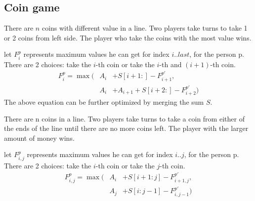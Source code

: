 \subsection{Coin game}
 There are $n$ coins with different value in a line. Two players take turns to take 1 or 2 coins from left side. The player who take the coins with the most value wins.

let $F_i^p$ represents maximum values he can get for index $i..last$, for the person p. There are 2 choices: take the $i$-th coin or take the $i$-th and $(i+1)$-th coin.
\begin{eqnarray*}
F_i^p = \max\big(&A_i&+S[i+1:]-F_{i+1}^{p'},  \\
&A_i&+A_{i+1}+S[i+2:]-F_{i+2}^{p'}\big)
\end{eqnarray*}
The above equation can be further optimized by merging the sum $S$.

There are n coins in a line. Two players take turns to take a coin from either of the ends of the line until there are no more coins left. The player with the larger amount of money wins.

let $F_{i, j}^p$ represents maximum values he can get for index $i..j$, for
the person p. There are 2 choices: take the $i$-th coin or take the $j$-th coin.
\begin{eqnarray*}
F_{i,j}^p = \max\big(&A_i&+S[i+1:j]-F_{i+1,j}^{p'},  \\
&A_j&+S[i:j-1]-F_{i,j-1}^{p'}\big)
\end{eqnarray*}
